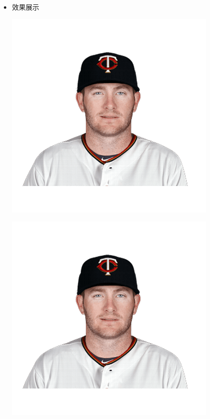 \documentclass[UTF8]{ctexart}
\begin{document}
\begin{enumerate}
\begin{itemize}
\begin{lstlisting}
    \captionof{figure}{Image 2}
  \end{minipage}
\end{mdframed}
\end{lstlisting}
\item 效果展示

\begin{mdframed}
  \begin{minipage}{0.5\textwidth}
    \includegraphics[width=\linewidth]{good}
  \end{minipage}
  \hfill
  \begin{minipage}{0.5\textwidth}
    \includegraphics[width=\linewidth]{good}

\end{minipage}
\end{mdframed}
\end{itemize}
\end{enumerate}
\end{document}
